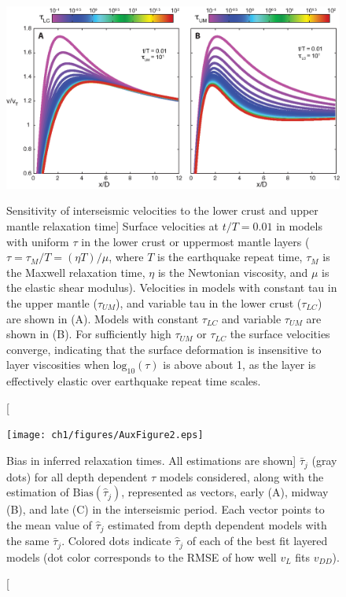 \begin{figure}
\includegraphics{ch1/figures/AuxFigure1.eps}
\caption
[Sensitivity of interseismic velocities to the lower crust and upper
mantle relaxation time]
{Surface velocities at $t/T = 0.01$ in models with uniform
$\tau$ in the lower crust or uppermost mantle layers ($\tau = \tau_M/T
= (\eta T)/\mu$, where $T$ is the earthquake repeat time, $\tau_M$ is
the Maxwell relaxation time, $\eta$ is the Newtonian viscosity, and
$\mu$ is the elastic shear modulus).  Velocities in models with
constant tau in the upper mantle ($\tau_{UM}$), and variable tau in
the lower crust ($\tau_{LC}$) are shown in (A).  Models with constant
$\tau_{LC}$ and variable $\tau_{UM}$ are shown in (B).  For
sufficiently high $\tau_{UM}$ or $\tau_{LC}$ the surface velocities
converge, indicating that the surface deformation is insensitive to
layer viscosities when $\mathrm{log}_{10}(\tau)$ is above about 1, as
the layer is effectively elastic over earthquake repeat time scales.}
\label{ch1:fig:A1}
\end{figure}

\begin{figure}
\texttt{[image: ch1/figures/AuxFigure2.eps]}
\caption
[Bias in inferred relaxation times. All estimations are shown]
{$\bar{\tau}_j$ (gray dots) for all depth dependent $\tau$ models
considered, along with the estimation of
$\mathrm{Bias}(\hat{\tau}_j)$, represented as vectors, early (A),
midway (B), and late (C) in the interseismic period.  Each vector
points to the mean value of $\hat{\tau}_j$ estimated from depth
dependent models with the same $\bar{\tau}_j$.  Colored dots indicate
$\hat{\tau}_j$ of each of the best fit layered models (dot color
corresponds to the RMSE of how well $v_L$ fits $v_{DD}$).}
\label{ch1:fig:A2}
\end{figure}


